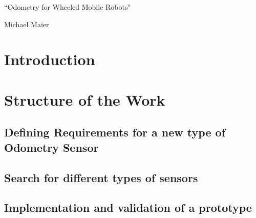\documentclass[12pt,a4paper]{article}
\begin{document}
%
\pagestyle{plain}


\begin{center}

\vspace{-15mm}

\huge ``Odometry for Wheeled Mobile Robots"

\vspace{1cm}

\large Michael Maier

\end{center}

%
\section{Introduction}



\section{Structure of the Work}


\subsection{Defining Requirements for a new type of Odometry Sensor}


\subsection{Search for different types of sensors}


\subsection{Implementation and validation of a prototype}

\label{Bibliography}


%
\end{document}
